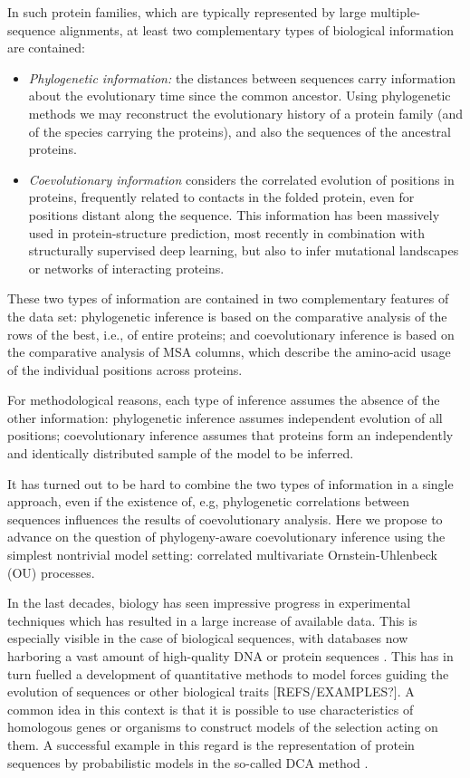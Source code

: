 \documentclass[preprint,amsmath,amssymb,superscriptaddress,showpacs,pre]{revtex4-1}
\begin{document}
In such protein families, which are typically represented by large multiple-sequence alignments, at least two complementary types of biological information are contained:
\begin{itemize}
    \item {\it Phylogenetic information:} the distances between sequences carry information about the evolutionary time since the common ancestor. Using phylogenetic methods we may reconstruct the evolutionary history of a protein family (and of the species carrying the proteins), and also the sequences of the ancestral proteins. 
    \item {\it Coevolutionary information} considers the correlated evolution of positions in proteins, frequently related to contacts in the folded protein, even for positions distant along the sequence. This information has been massively used in protein-structure prediction, most recently in combination with structurally supervised deep learning, but also to infer mutational landscapes or networks of interacting proteins.
\end{itemize}

These two types of information are contained in two complementary features of the data set: phylogenetic inference is based on the comparative analysis of the rows of the best, i.e., of entire proteins; and coevolutionary inference is based on the comparative analysis of MSA columns, which describe the amino-acid usage of the individual positions across proteins.

For methodological reasons, each type of inference assumes the absence of the other information: phylogenetic inference assumes independent evolution of all positions; coevolutionary inference assumes that proteins form an independently and identically distributed sample of the model to be inferred.

It has turned out to be hard to combine the two types of information in a single approach, even if the existence of, e.g, phylogenetic correlations between sequences influences the results of coevolutionary analysis. Here we propose to advance on the question of phylogeny-aware coevolutionary inference using the simplest nontrivial model setting: correlated multivariate Ornstein-Uhlenbeck (OU) processes.

In the last decades, biology has seen impressive progress in experimental techniques which has resulted in a large increase of available data. 
This is especially visible in the case of biological sequences,  with databases now harboring a vast amount of high-quality DNA or protein sequences \cite{sayers_genbank_2019,uniprotconsortium_uniprot_2018}. 
This has in turn fuelled a development of quantitative methods to model forces guiding the evolution of sequences or other biological traits [REFS/EXAMPLES?]. 
A common idea in this context is that it is possible to use characteristics of homologous genes or organisms to construct models of the selection acting on them. 
A successful example in this regard is the representation of protein sequences by probabilistic models in the so-called DCA method \cite{levy_potts_2017,cocco_inverse_2018}. 
\end{document}
